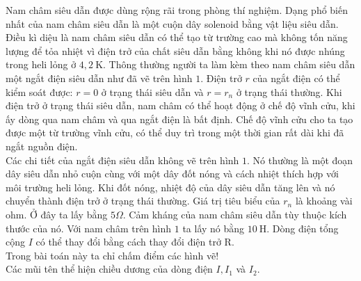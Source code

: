 \begin{vd}%
Nam châm siêu dẫn được dùng rộng rãi trong phòng thí nghiệm. Dạng phổ biến nhất của nam châm siêu dẫn là một cuộn dây solenoid bằng vật liệu siêu dẫn. Điều kì diệu là nam châm siêu dẫn có thể tạo từ trường cao mà không tốn năng lượng để tỏa nhiệt vì điện trở của chất siêu dẫn bằng không khi nó được nhúng trong heli lỏng ở $4,2 \mathrm{~K}$. Thông thường người ta làm kèm theo nam châm siêu dẫn một ngắt điện siêu dẫn như đã vẽ trên hình $1$. Điện trở $r$ của ngắt điện có thể kiểm soát được: $r = 0$ ở trạng thái siêu dẫn và $r = r_{n}$ ở trạng thái thường. Khi điện trở ở trạng thái siêu dẫn, nam châm có thể hoạt động ở chế độ vĩnh cửu, khi ấy dòng qua nam châm và qua ngắt điện là bất định. Chế độ vĩnh cửu cho ta tạo được một từ trường vĩnh cửu, có thể duy trì trong một thời gian rất dài khi đã ngắt nguồn điện.\\
Các chi tiết của ngắt điện siêu dẫn không vẽ trên hình $1$.  Nó thường là một đoạn dây siêu dẫn nhỏ cuộn cùng với một dây đốt nóng và cách nhiệt thích hợp với môi trường heli lỏng. Khi đốt nóng, nhiệt độ của dây siêu dẫn tăng lên và nó chuyển thành điện trở ở trạng thái thường. Giá trị tiêu biểu của $r_{n}$ là khoảng vài ohm. Ở đây ta lấy bằng $5 \Omega$. Cảm kháng của nam châm siêu dẫn tùy thuộc kích thước của nó. Với nam châm trên hình $1$ ta lấy nó bằng $10 \mathrm{~H}$. Dòng điện tổng cộng $I$ có thể thay đổi bằng cách thay đổi điện trở $\mathrm{R}$.\\
Trong bài toán này ta chỉ chấm điểm các hình vẽ!\\
Các mũi tên thể hiện chiều dương của dòng điện $I, I_1$ và $I_2$.
\begin{center}



\begin{tikzpicture}[x=0.75pt,y=0.75pt,yscale=-1,xscale=1]


\end{tikzpicture}
\end{center}
\end{vd}
